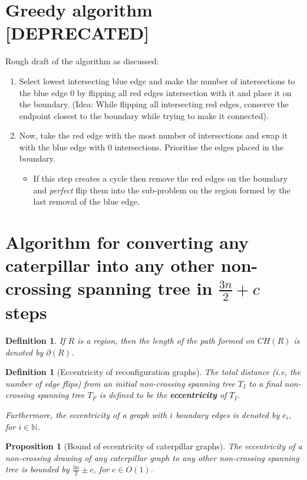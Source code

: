 \documentclass{article}
\newtheorem{proposition}[theorem]{Proposition}
\newtheorem{definition}[theorem]{Definition}
\begin{document}
\section{Greedy algorithm [DEPRECATED]}

Rough draft of the algorithm as discussed:

\begin{enumerate}
	\item Select lowest intersecting blue edge and make the number of intersections to the blue edge $0$ by flipping all red edges intersection with it and place it on the boundary. (Idea: While flipping all intersecting red edges, conserve the endpoint closest to the boundary while trying to make it connected).
	\item Now, take the red edge with the most number of intersections and swap it with the blue edge with $0$ intersections. Prioritise the edges placed in the boundary.
	      \begin{itemize}
		      \item If this step creates a cycle then remove the red edges on the boundary and \textit{perfect} flip them into the sub-problem on the region formed by the last removal of the blue edge.
	      \end{itemize}
\end{enumerate}

\section{Algorithm for converting any caterpillar into any other non-crossing spanning tree in $\frac{3n}{2} + c$ steps}


\begin{definition}
	If $R$ is a region, then the length of the path formed on $CH(R)$ is denoted by $\partial(R)$.
\end{definition}

\begin{definition}[Eccentricity of reconfiguration graphs]
	The total distance (i.e, the number of edge flips) from an initial non-crossing spanning tree $T_I$ to a final non-crossing spanning tree $T_F$ is defined to be the \textbf{\textit{eccentricity}} of $T_I$.

	Furthermore, the eccentricity of a graph with $i$ boundary edges is denoted by $e_i$, for $i \in \mathbb{N}$.
\end{definition}

\begin{proposition}[Bound of eccentricity of caterpillar graphs]
	\label{prop:eccentricity-bound-caterpillar}
	The eccentricity of a non-crossing drawing of any caterpillar graph to any other non-crossing spanning tree is bounded by $\frac{3n}{2} \pm c$, for $c \in O(1)$.
\end{proposition}
\end{document}
